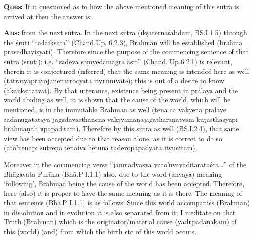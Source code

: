 \textbf{Ques:} If it questioned as to how the above mentioned meaning of this sūtra is arrived at then the answer is: 

\textbf{Ans:} from the next sūtra. In the next sūtra (īkṣaternāśabdam, BS.I.1.5) through the śruti “tadaikṣata” (Chānd.Up. 6.2.3), Brahman will be established (brahma prasādhayiṣyati).  Therefore since the purpose of the commencing sentence of that sūtra (śruti): i.e. “sadeva somyedamagra āsīt” (Chānd. Up.6.2.1) is relevant, therein it is conjectured (inferred) that the same meaning is intended here as well (tatratyaprayojanenātrocyata ityunnīyate); this is out of a desire to know (ākāṅkṣitatvāt). By that utterance, existence being present in pralaya and the world abiding as well, it is shown that the cause of the world, which will be mentioned, is in the immutable Brahman as well (tena ca vākyena pralaye sadanugatatayā jagadavasthānena vakṣyamāṇajagatkāraṇatvam kūṭasthasyāpi brahmaṇah upapāditam). Therefore by this sūtra as well (BS.I.2.4), that same view has been accepted due to that reason alone, as it is correct to do so (ato’nenāpi sūtreṇa tenaiva hetunā tadevopapādyata ityucitam).

Moreover in the commencing verse “janmādyasya yato’nvayāditarata\-śca…” of the Bhāgavata Purāṇa (Bhā.P I.1.1) also, due to the word (anvaya) meaning ‘following’, Brahman being the cause of the world has been accepted. Therefore, here (also) it is proper to have the same meaning as it is there. The meaning of that sentence (Bhā.P I.1.1) is as follows:  Since this world accompanies (Brahman) in dissolution and in evolution it is also separated from it; I meditate on that Truth (Brahman) which is the originator/material cause (yadupādānakam) of this (world) (and) from which the birth etc of this world occurs.   

